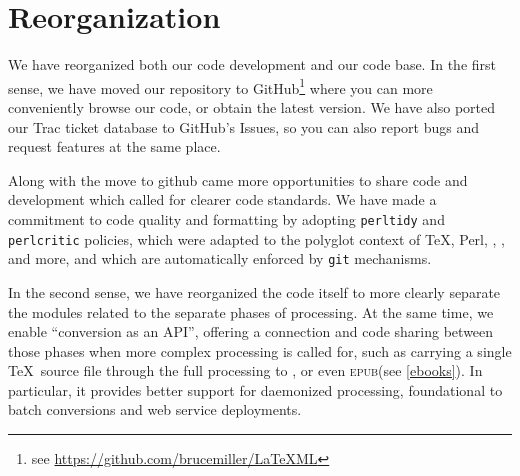 \documentclass{llncs}
\def\epub{\textsc{epub}\xspace}
\begin{document}

\section{Reorganization}\label{reorganization}
We have reorganized both our code development and our code base.
In the first sense, we have moved our repository to GitHub\footnote{see \url{https://github.com/brucemiller/LaTeXML}} 
where you can more conveniently browse our code, or obtain the latest version.
We have also ported our Trac ticket database to GitHub's Issues,
so you can also report bugs and request features at the same place.

Along with the move to github came more opportunities to share
code and development which called for clearer code standards.
We have made a commitment to code quality and formatting by
adopting \texttt{perltidy} and \texttt{perlcritic} policies,
which were adapted to the polyglot context of \TeX, Perl, \XML,
\XSLT, and more, and which are automatically enforced by \texttt{git} mechanisms.

In the second sense, we have reorganized the code itself to more clearly
separate the modules related to the separate phases of processing.
At the same time, we enable ``conversion as an API'', offering a connection and code sharing between those phases when more
complex processing is called for, such as carrying a single \TeX\ source
file through the full processing to \HTML, or even \epub (see \ref{ebooks}).
In particular, it provides better support for daemonized processing, foundational to batch conversions and web service deployments.
\end{document}
